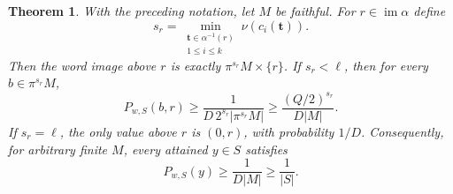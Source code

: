 \documentclass[11pt]{article}
\newtheorem{theorem}{Theorem}[section]
\theoremstyle{remark}\newtheorem{remark}[theorem]{Remark}
\newcommand{\im}{\operatorname{im}}
\begin{document}
\begin{theorem}\label{thm:split}
With the preceding notation, let $M$ be faithful. For $r\in\im\alpha$ define
\begin{equation}\label{eq:s}
 s_r=\min_{\substack{\mathbf t\in\alpha^{-1}(r)\\1\le i\le k}}
       \nu(c_i(\mathbf t)).
\end{equation}
Then the word image above $r$ is exactly $\pi^{s_r}M\times\{r\}$.
If $s_r<\ell$, then for every $b\in\pi^{s_r}M$,
\begin{equation}\label{eq:refined}
 P_{w,S}(b,r)\ge\frac{1}{D\,2^{s_r}|\pi^{s_r}M|}
 \ge\frac{(Q/2)^{s_r}}{D|M|}.
\end{equation}
If $s_r=\ell$, the only value above $r$ is $(0,r)$, with probability $1/D$.
Consequently, for arbitrary finite $M$, every attained $y\in S$ satisfies
\begin{equation}\label{eq:strong}
 P_{w,S}(y)\ge\frac1{D|M|}\ge\frac1{|S|}.
\end{equation}
\end{theorem}
\end{document}
